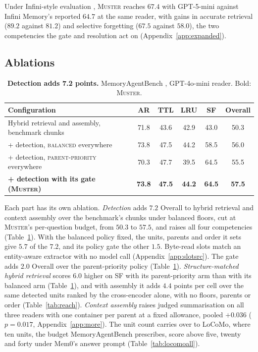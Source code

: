 \documentclass{article}
\newcommand{\ours}{\rowcolor{oursbg}}
\newcommand{\tabfont}{\fontsize{7.5}{8.5}\selectfont\renewcommand{\arraystretch}{1.0}}
\newcommand{\sys}{\textsc{Muster}}
\newcommand{\balanced}{\textsc{balanced}}
\newcommand{\parprio}{\textsc{parent-priority}}
\begin{document}
Under Infini-style evaluation \cite{infini}, \sys{} reaches $67.4$ with GPT-5-mini against Infini Memory's reported $64.7$ at the same reader, with gains in accurate retrieval ($89.2$ against $81.2$) and selective forgetting ($67.5$ against $58.0$), the two competencies the gate and resolution act on (Appendix~\ref{app:expanded}).

\subsection{Ablations}\label{sec:ablations}

\begin{table}[t]
\centering\tabfont
\caption{\textbf{Detection adds 7.2 points.} MemoryAgentBench \cite{mab}, GPT-4o-mini \cite{gpt4omini} reader. Bold: \sys{}.}
\label{tab:gate}
\setlength{\tabcolsep}{3pt}\setlength{\aboverulesep}{0pt}\setlength{\belowrulesep}{0pt}\setlength{\extrarowheight}{0.8pt}
\begin{tabular}{l*{5}{c}}
\toprule
Configuration & AR & TTL & LRU & SF & Overall \\
\midrule
Hybrid retrieval and assembly, benchmark chunks & 71.8 & 43.6 & 42.9 & 43.0 & 50.3 \\
\midrule
+ detection, \balanced{} everywhere & 73.8 & 47.5 & 44.2 & 58.5 & 56.0 \\
+ detection, \parprio{} everywhere & 70.3 & 47.7 & 39.5 & 64.5 & 55.5 \\
\midrule
\ours \textbf{+ detection with its gate (\sys{})} & \textbf{73.8} & \textbf{47.5} & \textbf{44.2} & \textbf{64.5} & \textbf{57.5} \\
\bottomrule
\end{tabular}
\end{table}

Each part has its own ablation. \emph{Detection} adds $7.2$ Overall to hybrid retrieval and context assembly over the benchmark's chunks under balanced floors, cut at \sys{}'s per-question budget, from $50.3$ to $57.5$, and raises all four competencies (Table~\ref{tab:gate}). With the balanced policy fixed, the units, parents and order it sets give $5.7$ of the $7.2$, and its policy gate the other $1.5$. Byte-read slots match an entity-aware extractor with no model call (Appendix~\ref{app:slotsrc}). The gate adds $2.0$ Overall over the parent-priority policy (Table~\ref{tab:gate}). \emph{Structure-matched hybrid retrieval} scores $6.0$ higher on SF with its parent-priority arm than with its balanced arm (Table~\ref{tab:gate}), and with assembly it adds $4.4$ points per cell over the same detected units ranked by the cross-encoder alone, with no floors, parents or order (Table~\ref{tab:reach}). \emph{Context assembly} raises judged summarisation on all three readers with one container per parent at a fixed allowance, pooled $+0.036$ ($p=0.017$, Appendix~\ref{app:more}). The unit count carries over to LoCoMo, where ten units, the budget MemoryAgentBench prescribes, score above five, twenty and forty under Mem0's answer prompt (Table~\ref{tab:locomoall}).
\end{document}
